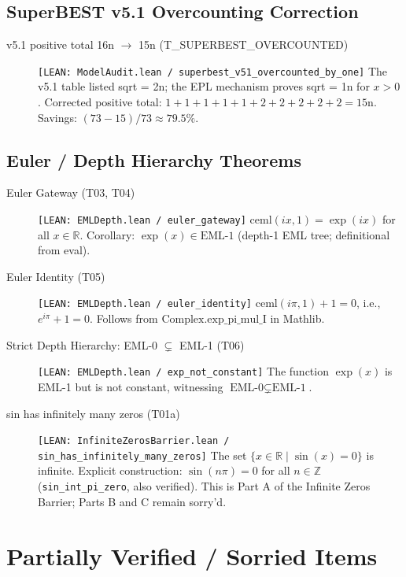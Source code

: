 \documentclass[11pt]{article}
\newcommand{\lean}[2]{\textcolor{leangreen}{\texttt{[LEAN: #1 / #2]}}}
\begin{document}
\subsection{SuperBEST v5.1 Overcounting Correction}

\begin{description}
\item[v5.1 positive total 16n $\to$ 15n (T\_SUPERBEST\_OVERCOUNTED)]
  \lean{ModelAudit.lean}{superbest\_v51\_overcounted\_by\_one}
  The v5.1 table listed sqrt = 2n; the EPL mechanism proves sqrt = 1n for $x > 0$.
  Corrected positive total: $1+1+1+1+1+2+2+2+2+2 = 15$n.
  Savings: $(73-15)/73 \approx 79.5\%$.
\end{description}

\subsection{Euler / Depth Hierarchy Theorems}

\begin{description}
\item[Euler Gateway (T03, T04)]
  \lean{EMLDepth.lean}{euler\_gateway}
  $\text{ceml}(ix, 1) = \exp(ix)$ for all $x \in \mathbb{R}$.
  Corollary: $\exp(x) \in \text{EML-1}$ (depth-1 EML tree; definitional from eval).

\item[Euler Identity (T05)]
  \lean{EMLDepth.lean}{euler\_identity}
  $\text{ceml}(i\pi, 1) + 1 = 0$, i.e., $e^{i\pi} + 1 = 0$. Follows from
  $\text{Complex.exp\_pi\_mul\_I}$ in Mathlib.

\item[Strict Depth Hierarchy: EML-0 $\subsetneq$ EML-1 (T06)]
  \lean{EMLDepth.lean}{exp\_not\_constant}
  The function $\exp(x)$ is EML-1 but is not constant, witnessing $\text{EML-0} \subsetneq \text{EML-1}$.

\item[sin has infinitely many zeros (T01a)]
  \lean{InfiniteZerosBarrier.lean}{sin\_has\_infinitely\_many\_zeros}
  The set $\{x \in \mathbb{R} \mid \sin(x) = 0\}$ is infinite. Explicit construction:
  $\sin(n\pi) = 0$ for all $n \in \mathbb{Z}$ (\texttt{sin\_int\_pi\_zero}, also verified).
  This is Part A of the Infinite Zeros Barrier; Parts B and C remain sorry'd.
\end{description}

\section{Partially Verified / Sorried Items}
\end{document}
